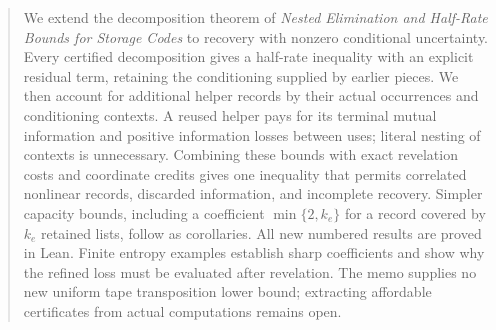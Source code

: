 \begin{abstract}
We extend the decomposition theorem of \emph{Nested Elimination and
Half-Rate Bounds for Storage Codes} to recovery with nonzero conditional
uncertainty. Every certified decomposition gives a half-rate inequality
with an explicit residual term, retaining the conditioning supplied by
earlier pieces. We then account for additional helper records by their
actual occurrences and conditioning contexts. A reused helper pays for
its terminal mutual information and positive information losses between
uses; literal nesting of contexts is unnecessary. Combining these bounds
with exact revelation costs and coordinate credits gives one inequality
that permits correlated nonlinear records, discarded information, and
incomplete recovery. Simpler capacity bounds, including a coefficient
$\min\{2,k_e\}$ for a record covered by $k_e$ retained lists, follow as
corollaries. All new numbered results are proved in Lean. Finite entropy
examples establish sharp coefficients and show why the refined loss must
be evaluated after revelation. The memo supplies no new uniform tape
transposition lower bound; extracting affordable certificates from actual
computations remains open.
\end{abstract}
